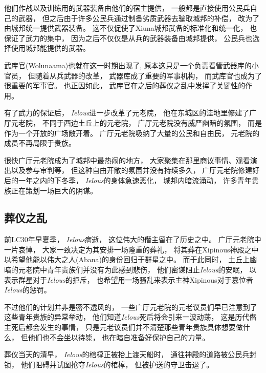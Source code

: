 \documentclass[12pt, a4paper]{ctexart}
\begin{document}
        他们作战以及训练用的武器装备由他们的宿主提供，
        一般都是直接使用公民兵自己的武器，
        但之后由于许多公民兵通过制备劣质武器去骗取城邦的补偿，
        改为了由城邦统一提供武器装备。
        这不仅促使了Xiuna城邦武备的标准化和统一化，
        也保证了武力的集中，
        因为之后不仅仅是从兵的武器装备由城邦提供，
        公民兵也选择使用城邦能提供的武器。
        
        武库官(Wolunaama)也就在这一时期出现了,
        原本这只是一个负责看管武器库的小官员，
        但随着从兵武器的改革，
        武器库成了重要的军事机构，
        而武库官也成为了很重要的军事官。
        也正因如此，
        武库官在之后的葬仪之乱中发挥了关键性的作用。

        有了武力的保证后，
        \emph{Ielous}进一步改革了元老院，
        他在东城区的洼地里修建了广厅元老院，
        不同于西边土丘上的元老院，
        广厅元老院没有威严幽暗的氛围，
        而是作为一个开放的广场敞开着。
        广厅元老院吸纳了大量的公民和自由民，
        元老院的成员不再局限于贵族。

        很快广厅元老院成为了城邦中最热闹的地方，
        大家聚集在那里商议事情、观看演出以及参与审判等，
        但这种自由开敞的氛围并没有持续多久，
        广厅元老院修建好后的一年之内的下冬季，
        \emph{Ielous}的身体急速恶化，
        城邦内暗流涌动，
        许多青年贵族正在策划一场巨大的阴谋。
    \subsection{葬仪之乱}
        前LC30年早夏季，
        \emph{Ielous}病逝，
        这位伟大的僭主留在了历史之中。
        广厅元老院中一片哀悼，
        大家一致决定为其安排一场隆重的葬礼，
        将其葬在Xipinous神殿之中以希望他能以伟大之人(Abana)的身份回归于群星之中。
        而于此同时，
        土丘上幽暗的元老院中青年贵族们并没有为此感到悲伤，
        他们密谋阻止\emph{Ielous}的安眠，
        以表示群星对于\emph{Ielous}的拒斥，
        也希望用一场骚乱来表示主神Xipinous对于篡位者\emph{Ielous}的惩罚。

        不过他们的计划并非是密不透风的，
        一些广厅元老院的元老议员们早已注意到了这些青年贵族的异常举动，
        他们知道\emph{Ielous}死后将会引来一波动荡，
        这是历代僭主死后都会发生的事情，
        只是元老议员们并不清楚那些青年贵族具体想要做什么，
        但他们也不会坐以待毙，
        也在暗自准备好保护自己的力量。

        葬仪当天的清早，
        \emph{Ielous}的棺椁正被抬上渡天船时，
        通往神殿的道路被公民兵封锁，
        他们阻碍并试图抢夺\emph{Ielous}的棺椁，
        但被护送的守卫击退了。
\end{document}

